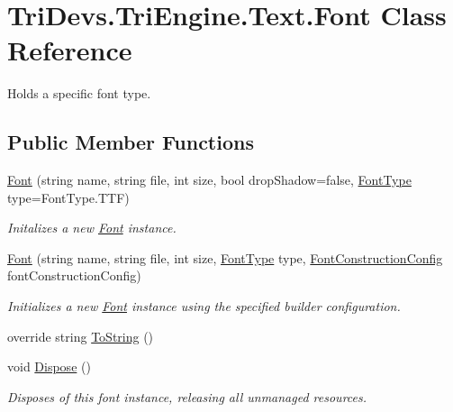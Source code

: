 \hypertarget{class_tri_devs_1_1_tri_engine_1_1_text_1_1_font}{\section{Tri\-Devs.\-Tri\-Engine.\-Text.\-Font Class Reference}
\label{class_tri_devs_1_1_tri_engine_1_1_text_1_1_font}
}


Holds a specific font type.  


\subsection*{Public Member Functions}
\begin{DoxyCompactItemize}
\item 
\hyperlink{class_tri_devs_1_1_tri_engine_1_1_text_1_1_font_a83f848f81b0779d021986f92f31857c0}{Font} (string name, string file, int size, bool drop\-Shadow=false, \hyperlink{namespace_tri_devs_1_1_tri_engine_1_1_text_a823573b800952d8909dc50e1efa3358b}{Font\-Type} type=Font\-Type.\-T\-T\-F)
\begin{DoxyCompactList}\small\item\em Initalizes a new \hyperlink{class_tri_devs_1_1_tri_engine_1_1_text_1_1_font}{Font} instance. \end{DoxyCompactList}\item 
\hyperlink{class_tri_devs_1_1_tri_engine_1_1_text_1_1_font_aff7dcb743feea13d90748bee0a0c029a}{Font} (string name, string file, int size, \hyperlink{namespace_tri_devs_1_1_tri_engine_1_1_text_a823573b800952d8909dc50e1efa3358b}{Font\-Type} type, \hyperlink{class_tri_devs_1_1_tri_engine_1_1_text_1_1_font_construction_config}{Font\-Construction\-Config} font\-Construction\-Config)
\begin{DoxyCompactList}\small\item\em Initializes a new \hyperlink{class_tri_devs_1_1_tri_engine_1_1_text_1_1_font}{Font} instance using the specified builder configuration. \end{DoxyCompactList}\item 
override string \hyperlink{class_tri_devs_1_1_tri_engine_1_1_text_1_1_font_ab60bc463144b900144b0339f7b6c744b}{To\-String} ()
\item 
void \hyperlink{class_tri_devs_1_1_tri_engine_1_1_text_1_1_font_aa57f85e9907ea04fe8fa4a9d901f6fd7}{Dispose} ()
\begin{DoxyCompactList}\small\item\em Disposes of this font instance, releasing all unmanaged resources. \end{DoxyCompactList}\end{DoxyCompactItemize}
